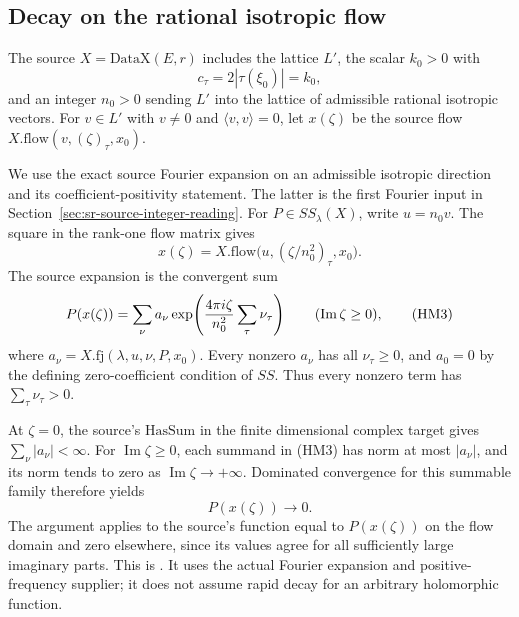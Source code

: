\subsection{Decay on the rational isotropic flow}
The source \(X=\mathrm{DataX}(E,r)\) includes the lattice \(L'\),
the scalar \(k_0>0\) with
\[
                     c_\tau=2|\tau(\xi_0)|=k_0,
\]
and an integer \(n_0>0\) sending \(L'\) into the lattice of
admissible rational isotropic vectors.
For \(v\in L'\) with \(v\ne0\) and
\(\langle v,v\rangle=0\), let \(x(\zeta)\) be the source flow
\(X.\mathrm{flow}(v,(\zeta)_\tau,x_0)\).

We use the exact source Fourier expansion on an admissible
isotropic direction and its coefficient-positivity statement.
The latter is the first Fourier input in
Section~\ref{sec:sr-source-integer-reading}.
For \(P\in SS_\lambda(X)\), write \(u=n_0v\).
The square in the rank-one flow matrix gives
\[
      x(\zeta)
        =X.\mathrm{flow}\bigl(u,(\zeta/n_0^2)_\tau,x_0\bigr).
 \tag{HM2}\label{eq:sr-source-flow-rescale}
\]
The source expansion is the convergent sum
\[
 P(x(\zeta))=\sum_\nu a_\nu
       \exp\!\left({4\pi i\zeta\over n_0^2}
                              \sum_\tau\nu_\tau\right)
                  \qquad(\operatorname{Im}\zeta\ge0),
 \tag{HM3}\label{eq:sr-source-isotropic-expansion}
\]
where \(a_\nu=X.\mathrm{fj}(\lambda,u,\nu,P,x_0)\).
Every nonzero \(a_\nu\) has all \(\nu_\tau\ge0\), and
\(a_0=0\) by the defining zero-coefficient condition of \(SS\).
Thus every nonzero term has \(\sum_\tau\nu_\tau>0\).

At \(\zeta=0\), the source's \(\mathrm{HasSum}\) in the finite
dimensional complex target gives \(\sum_\nu|a_\nu|<\infty\).
For \(\operatorname{Im}\zeta\ge0\), each summand in (HM3) has
norm at most \(|a_\nu|\), and its norm tends to zero as
\(\operatorname{Im}\zeta\to+\infty\).
Dominated convergence for this summable family therefore yields
\[
                         P(x(\zeta))\longrightarrow0 .
 \tag{HM4}\label{eq:sr-source-flow-decay}
\]
The argument applies to the source's function equal to
\(P(x(\zeta))\) on the flow domain and zero elsewhere, since its
values agree for all sufficiently large imaginary parts.
This is
.
It uses the actual Fourier expansion and positive-frequency
supplier; it does not assume rapid decay for an arbitrary
holomorphic function.

